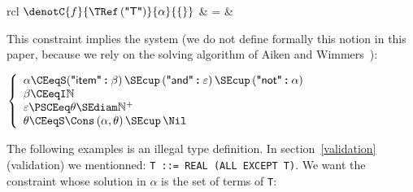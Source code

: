 \begin{tabular}{rcl}
    $\denotC{f}{\TRef \, (\textsf{"T"})}{\alpha}{\{\}}$
  & \hspace*{-4mm} = &\\
\end{tabular}

\noindent
This constraint implies the system (we do not define formally this
notion in this paper, because we rely on the solving algorithm of
Aiken and Wimmers~\cite{AikenWimmers:1992}):

\centerline{
$\left\{
  \begin{array}{l}
    \alpha \CEeqS (\textsf{"item"} \pmb{:} \beta) \,
    \SEcup \, (\textsf{"and"} \pmb{:} \varepsilon) \, \SEcup \,
    (\textsf{"not"} \pmb{:} \alpha)\\
    \beta \CEeqI \mathbb{N}\\
    \varepsilon \PSCEeq \theta \SEdiam \mathbb{N}^{+}\\
    \theta \CEeqS \Cons \, (\alpha, \theta) \, \SEcup \, \Nil
  \end{array}
\right.$}

The following examples is an illegal type
definition.\label{illegal_type} In section~\ref{validation}
(validation) we mentionned: \texttt{\small T ::= REAL (ALL EXCEPT
  T)}. We want the constraint whose solution in $\alpha$ is the set of
terms of \texttt{\small T}:

